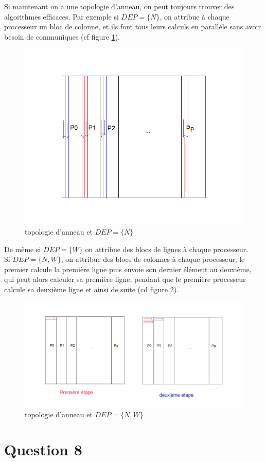 \documentclass[a4paper,11pt]{article}
\begin{document}
\\
\\
Si maintenant on a une topologie d'anneau, on peut toujours trouver des algorithmes efficaces. Par exemple si $DEP = \{N\}$, on attribue à chaque processeur un bloc de colonne, et ils font tous leurs calculs en parallèle sans avoir besoin de communiques (cf figure \ref{anneau1}).
\begin{figure}[!h]
\includegraphics[scale=0.5]{anneau1.png}
\caption{topologie d'anneau et $DEP = \{N\}$}
\label{anneau1}
\end{figure}
De même si $DEP = \{W\}$ on attribue des blocs de lignes à chaque processeur.\\
Si $DEP = \{N,W\}$, on attribue des blocs de colonnes à chaque processeur, le premier calcule la première ligne puis envoie son dernier élément au deuxième, qui peut alors calculer sa première ligne, pendant que le première processeur calcule sa deuxième ligne et ainsi de suite (cd figure \ref{anneau2}).
\begin{figure}[!h]
\includegraphics[scale=0.5]{anneau2.png}
\caption{topologie d'anneau et $DEP = \{N,W\}$}
\label{anneau2}
\end{figure}

\section*{Question 8}
\end{document}
